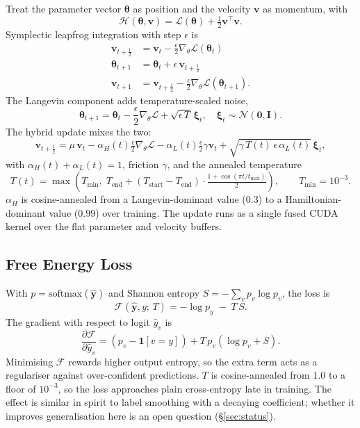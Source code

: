 \documentclass[11pt,a4paper]{article}
\newcommand{\calF}{\mathcal{F}}
\newcommand{\calH}{\mathcal{H}}
\newcommand{\calL}{\mathcal{L}}
\newcommand{\btheta}{\bm{\theta}}
\newcommand{\softmax}{\mathrm{softmax}}
\begin{document}
Treat the parameter vector $\btheta$ as position and the velocity
$\mathbf{v}$ as momentum, with
\begin{equation}
  \calH(\btheta, \mathbf{v}) = \calL(\btheta) + \tfrac{1}{2}\mathbf{v}^\top\mathbf{v}.
\end{equation}
Symplectic leapfrog integration with step $\epsilon$ is
\begin{align}
  \mathbf{v}_{t+\frac{1}{2}} &= \mathbf{v}_t - \frac{\epsilon}{2}\nabla_\theta \calL(\btheta_t)\\
  \btheta_{t+1} &= \btheta_t + \epsilon\,\mathbf{v}_{t+\frac{1}{2}}\\
  \mathbf{v}_{t+1} &= \mathbf{v}_{t+\frac{1}{2}} - \frac{\epsilon}{2}\nabla_\theta \calL(\btheta_{t+1}).
\end{align}
The Langevin component adds temperature-scaled noise,
\begin{equation}
  \btheta_{t+1} = \btheta_t - \frac{\epsilon}{2}\nabla_\theta\calL + \sqrt{\epsilon\,T}\,\bm{\xi}_t,
  \quad \bm{\xi}_t \sim \mathcal{N}(\mathbf{0}, \mathbf{I}).
\end{equation}
The hybrid update mixes the two:
\begin{equation}
  \mathbf{v}_{t+\frac{1}{2}} = \mu\,\mathbf{v}_t
    - \alpha_H(t)\tfrac{\epsilon}{2}\nabla_\theta\calL
    - \alpha_L(t)\tfrac{\epsilon}{2}\gamma\mathbf{v}_t
    + \sqrt{\gamma\,T(t)\,\epsilon\,\alpha_L(t)}\,\bm{\xi}_t,
\end{equation}
with $\alpha_H(t)+\alpha_L(t)=1$, friction $\gamma$, and the annealed
temperature
\begin{equation}
  T(t) = \max\!\left(T_{\min},\;
         T_{\text{end}} + (T_{\text{start}}-T_{\text{end}})
         \cdot\tfrac{1+\cos(\pi t/t_{\max})}{2}\right),
  \qquad T_{\min}=10^{-3}.
\end{equation}
$\alpha_H$ is cosine-annealed from a Langevin-dominant value
($0.3$) to a Hamiltonian-dominant value ($0.99$) over training. The
update runs as a single fused CUDA kernel over the flat parameter and
velocity buffers.

\subsection{Free Energy Loss}
\label{sec:free_energy}

With $p=\softmax(\hat{\mathbf{y}})$ and Shannon entropy
$S=-\sum_v p_v\log p_v$, the loss is
\begin{equation}
  \calF(\hat{\mathbf{y}}, y;\,T) = -\log p_y \;-\; T\,S.
\end{equation}
The gradient with respect to logit $\hat{y}_v$ is
\begin{equation}
  \frac{\partial\calF}{\partial \hat{y}_v}
  = (p_v - \mathbf{1}[v=y]) + T\,p_v\!\left(\log p_v + S\right).
\end{equation}
Minimising $\calF$ rewards higher output entropy, so the extra term acts
as a regulariser against over-confident predictions. $T$ is
cosine-annealed from $1.0$ to a floor of $10^{-3}$, so the loss
approaches plain cross-entropy late in training. The effect is similar in
spirit to label smoothing with a decaying coefficient; whether it
improves generalisation here is an open question
(\S\ref{sec:status}).
\end{document}
